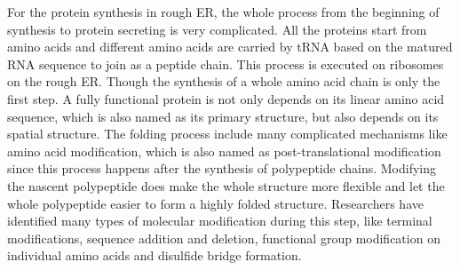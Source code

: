 For the protein synthesis in rough ER, the whole process from the beginning of synthesis to protein secreting is very complicated. All the proteins start from amino acids and different amino acids are carried by tRNA based on the matured RNA sequence to join as a peptide chain. This process is executed on ribosomes on the rough ER. Though the synthesis of a whole amino acid chain is only the first step. A fully functional protein is not only depends on its linear amino acid sequence, which is also named as its primary structure, but also depends on its spatial structure. The folding process include many complicated mechanisms like amino acid modification, which is also named as post-translational modification since this process happens after the synthesis of polypeptide chains. Modifying the nascent polypeptide does make the whole structure more flexible and let the whole polypeptide easier to form a highly folded structure. Researchers have identified many types of molecular modification during this step, like terminal modifications, sequence addition and deletion, functional group modification on individual amino acids and disulfide bridge formation. 
